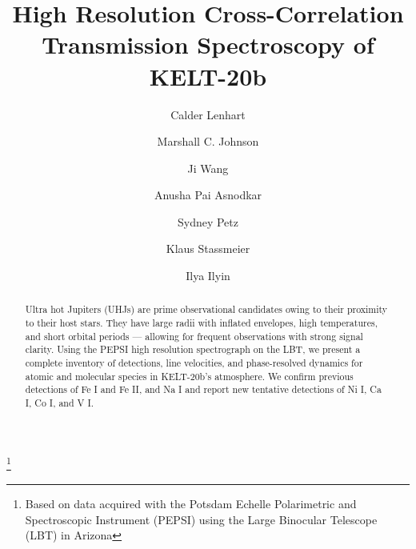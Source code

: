 \documentclass[twocolumn]{aastex631}
\begin{document}
    \title{High Resolution Cross-Correlation Transmission Spectroscopy of KELT-20b}\footnote{Based on data acquired with the Potsdam Echelle Polarimetric and Spectroscopic Instrument (PEPSI) using the Large Binocular Telescope (LBT) in Arizona}

    \author[0009-0001-1459-3738]{Calder Lenhart}

    \author[0000-0002-5099-8185]{Marshall C. Johnson}

    \author{Ji Wang}

    \author[0000-0002-8823-8237]{Anusha Pai Asnodkar}

    \author{Sydney Petz}

    \author[0000-0002-6192-6494]{Klaus Stassmeier}

    \author[0000-0002-0551-046X]{Ilya Ilyin}


    \begin{abstract}
        Ultra hot Jupiters (UHJs) are prime observational candidates owing to their proximity to their host stars. They have large radii with inflated envelopes, high temperatures, and short orbital periods --- allowing for frequent observations with strong signal clarity. Using the PEPSI high resolution spectrograph on the LBT, we present a complete inventory of detections, line velocities, and phase-resolved dynamics for atomic and molecular species in KELT-20b's atmosphere. We confirm previous detections of Fe I and Fe II, and Na I and report new tentative detections of Ni I, Ca I, Co I, and V I.
    \end{abstract}
\end{document}
